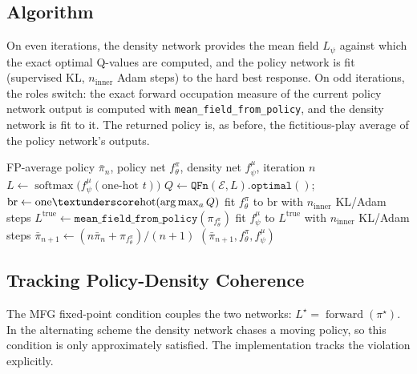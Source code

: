 \documentclass[11pt,a4paper]{article}
\begin{document}
\subsection{Algorithm}
On even iterations, the density network provides the mean field
$L_\psi$ against which the exact optimal Q-values are computed, and the
policy network is fit (supervised KL, $n_{\mathrm{inner}}$ Adam steps) to the
hard best response. On odd iterations, the roles switch: the exact forward
occupation measure of the current policy network output is computed with
\texttt{mean\_field\_from\_policy}, and the density network is fit to it. The
returned policy is, as before, the fictitious-play average of the policy
network's outputs.

\begin{algorithm}[H]
\caption{NeuralTwoNetworks: one outer iteration}\label{alg:twonets}
\begin{algorithmic}[1]
\Require FP-average policy $\bar{\pi}_n$, policy net $f^\pi_\theta$, density net $f^\mu_\psi$, iteration $n$
  \State $L \gets \operatorname{softmax}\bigl(f^\mu_\psi(\text{one-hot } t)\bigr)$ 
  \State $Q \gets \texttt{QFn}(\mathcal{E}, L).\texttt{optimal}()$;\ \ $\mathrm{br} \gets \operatorname{one\textunderscore hot}(\arg\max_a Q)$
  \State fit $f^\pi_\theta$ to $\mathrm{br}$ with $n_{\mathrm{inner}}$ KL/Adam steps
\Else
  \State $L^{\mathrm{true}} \gets \texttt{mean\_field\_from\_policy}(\pi_{f^\pi_\theta})$ 
  \State fit $f^\mu_\psi$ to $L^{\mathrm{true}}$ with $n_{\mathrm{inner}}$ KL/Adam steps
\EndIf
\State $\bar{\pi}_{n+1} \gets (n \bar{\pi}_n + \pi_{f^\pi_\theta}) / (n+1)$
\State \Return $(\bar{\pi}_{n+1}, f^\pi_\theta, f^\mu_\psi)$
\end{algorithmic}
\end{algorithm}


\subsection{Tracking Policy-Density Coherence}\label{sec:coherence}

The MFG fixed-point condition couples the two networks:
$L^\star = \operatorname{forward}(\pi^\star)$. In the alternating scheme the
density network chases a moving policy, so this condition is only
approximately satisfied. The implementation tracks the violation explicitly.
\end{document}
